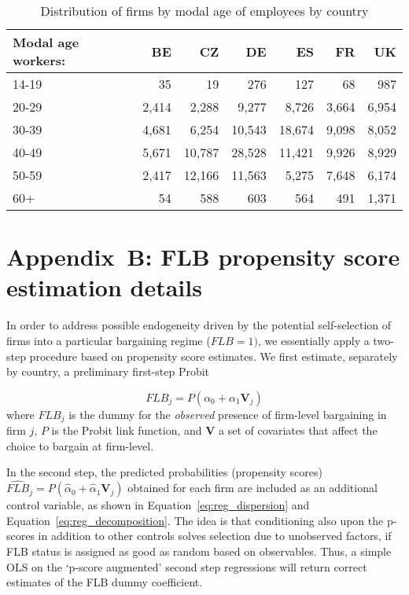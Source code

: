 \documentclass[Review,times,sageh,11pt]{sagej}
\begin{document}
\begin{table}[ht]
\caption{Distribution of firms by modal age of employees by country}
\label{tab:sum_reg_var_mod_age}
\centering
\small
\begin{tabular}{lrrrrrr}
\toprule
Modal age workers: & BE    & CZ     & DE     & ES     & FR    & UK    \\
\midrule
14-19              & 35    & 19     & 276    & 127    & 68    & 987   \\
20-29              & 2,414 & 2,288  & 9,277  & 8,726  & 3,664 & 6,954 \\
30-39              & 4,681 & 6,254  & 10,543 & 18,674 & 9,098 & 8,052 \\
40-49              & 5,671 & 10,787 & 28,528 & 11,421 & 9,926 & 8,929 \\
50-59              & 2,417 & 12,166 & 11,563 & 5,275  & 7,648 & 6,174 \\
60+                & 54    & 588    & 603    & 564    & 491   & 1,371 \\
\bottomrule
\end{tabular}
\end{table}

\clearpage

\section*{Appendix~B: FLB propensity score estimation details}
\noindent In order to address possible endogeneity driven by the potential self-selection of firms into a particular bargaining regime ($\mathit{FLB}=1)$, we essentially apply a two-step procedure based on propensity score estimates. We first estimate, separately by country, a preliminary first-step Probit

\begin{equation}
\label{eq:reg_propensity}
  \mathit{FLB}_j = \mathit{P}\left( \alpha_0 + \alpha_1\mathbf{V}_j \right)
\end{equation}
where $\mathit{FLB}_j$ is the dummy for the \emph{observed} presence of firm-level bargaining in firm $j$, $\mathit{P}$ is the Probit link function, and $\mathbf{V}$ a set of covariates that affect the choice to bargain at firm-level.

In the second step, the predicted probabilities (propensity scores)
$\widehat{\mathit{FLB}}_j = \mathit{P}\left( \hat{\alpha}_0 +
  \hat{\alpha}_1\mathbf{V}_j \right)$ obtained for each firm are included
as an additional control variable, as shown in Equation~\ref{eq:reg_dispersion} and Equation~\ref{eq:reg_decomposition}. The idea is that conditioning also upon the p-scores in addition to other controls solves selection due to unobserved factors, if FLB status is assigned as good as random based on observables. Thus, a simple OLS on the ‘p-score augmented’ second step regressions will return correct estimates of the FLB dummy coefficient.
\end{document}
